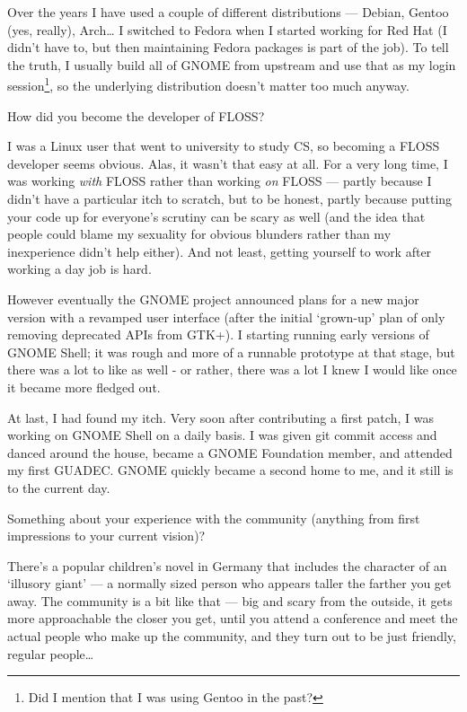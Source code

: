 \documentclass[10pt, a5paper]{article}
\begin{document}
\begin{Parallel}[p]{}{}
{Over the years I have used a couple of different distributions — Debian, Gentoo (yes, really), Arch… I switched to Fedora when I started working for Red Hat (I didn't have to, but then maintaining Fedora packages is part of the job). To tell the truth, I usually build all of GNOME from upstream and use that as my login session\footnote{Did I mention that I was using Gentoo in the past?}, so the underlying distribution doesn't matter too much anyway.




\q How did you become the developer of FLOSS?

\a I was a Linux user that went to university to study CS, so becoming a FLOSS developer seems obvious. Alas, it wasn't that easy at all. For a very long time, I was working \emph{with} FLOSS rather than working \emph{on} FLOSS — partly because I didn't have a particular itch to scratch, but to be honest, partly because putting your code up for everyone's scrutiny can be scary as well (and the idea that people could blame my sexuality for obvious blunders rather than my inexperience didn't help either). And not least, getting yourself to work after working a day job is hard.

However eventually the GNOME project announced plans for a new major version with a revamped user interface (after the initial ‘grown-up’ plan of only removing deprecated APIs from GTK+). I starting running early versions of GNOME  Shell; it was rough and more of a runnable prototype at that stage, but there was a lot to like as well - or rather, there was a lot I knew I would like once it became more fledged out.

At last, I had found my itch. Very soon after contributing a first patch, I was working on GNOME Shell on a daily basis. I was given git commit access and danced around the house, became a GNOME Foundation member, and attended my first GUADEC. GNOME quickly became a second home to me, and it still is to the current day.


\q Something about your experience with the community (anything from first
impressions to your current vision)?

\a There's a popular children's novel in Germany that includes the character of an ‘illusory giant’ — a normally sized person who appears taller the farther you get away. The community is a bit like that — big and scary from the outside, it gets more approachable the closer you get, until you attend a conference and meet the actual people who make up the community, and they turn out to be just friendly, regular people…

}
\end{Parallel}
\end{document}
